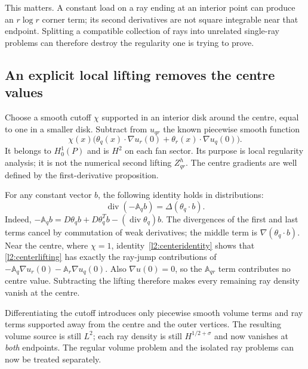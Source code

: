 This matters. A constant load on a ray ending at an interior point can
produce an $r\log r$ corner term; its second derivatives are not square
integrable near that endpoint. Splitting a compatible collection of rays
into unrelated single-ray problems can therefore destroy the regularity
one is trying to prove.

\subsection{An explicit local lifting removes the centre values}
Choose a smooth cutoff $\chi$ supported in an interior disk around the
centre, equal to one in a smaller disk. Subtract from $u_{qr}$ the known
piecewise smooth function
\begin{equation}
 \chi(x)\bigl(\theta_q(x)\cdot\nabla u_r(0)
                  +\theta_r(x)\cdot\nabla u_q(0)\bigr).
 \label{l2:centerlifting}
\end{equation}
It belongs to $H^1_0(P)$ and is $H^2$ on each fan sector. Its purpose is
local regularity analysis; it is not the numerical second lifting $Z_{qr}^h$.
The centre gradients are well defined by the first-derivative proposition.

For any constant vector $b$, the following identity holds in distributions:
\begin{equation}
 \operatorname{div}(-\mathbb A_q b)
     =\Delta(\theta_q\cdot b).
 \label{l2:centeridentity}
\end{equation}
Indeed,
$-\mathbb A_qb=D\theta_qb+D\theta_q^Tb-(\operatorname{div}\theta_q)b$.
The divergences of the first and last terms cancel by commutation of
weak derivatives; the middle term is $\nabla(\theta_q\cdot b)$.
Near the centre, where $\chi=1$, identity~\eqref{l2:centeridentity} shows
that \eqref{l2:centerlifting} has exactly the ray-jump contributions of
$-\mathbb A_q\nabla u_r(0)-\mathbb A_r\nabla u_q(0)$.
Also $\nabla u(0)=0$, so the $\mathbb A_{qr}$ term contributes no centre
value. Subtracting the lifting therefore makes every remaining ray
density vanish at the centre.

Differentiating the cutoff introduces only piecewise smooth volume terms
and ray terms supported away from the centre and the outer vertices.
The resulting volume source is still $L^2$; each ray density is still
$H^{1/2+\sigma}$ and now vanishes at \emph{both} endpoints. The regular
volume problem and the isolated ray problems can now be treated separately.

